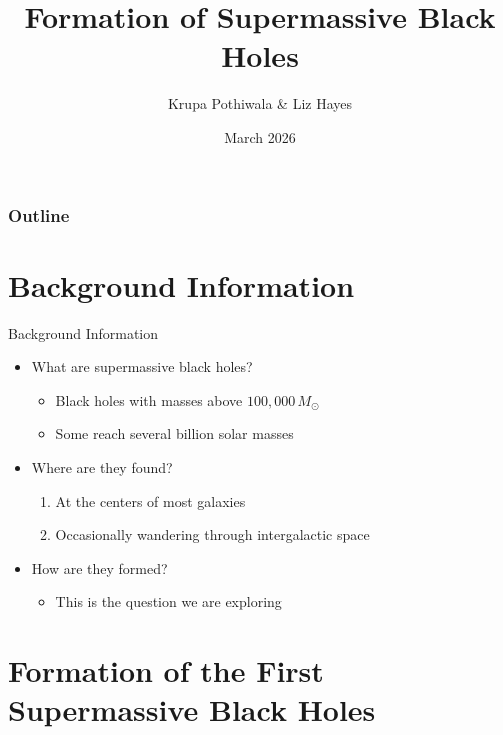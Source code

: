 \documentclass{beamer}
\title{Formation of Supermassive Black Holes}
\author{Krupa Pothiwala \& Liz Hayes}
\institute{Florida Institute of Technology}
\date{March 2026}
\begin{document}
\begin{frame}{}
\titlepage
\end{frame}

\begin{frame}
\frametitle{Outline}
\tableofcontents
\end{frame}


\section{Background Information}

\begin{frame}{Background Information}
\begin{itemize}

\item What are supermassive black holes?
\begin{itemize}
\item Black holes with masses above $100{,}000\,M_\odot$ \cite{Wikipedia2026}
\item Some reach several billion solar masses
\end{itemize}

\item Where are they found?
\begin{enumerate}
\item At the centers of most galaxies
\item Occasionally wandering through intergalactic space
\end{enumerate}

\item How are they formed?
\begin{itemize}
\item This is the question we are exploring
\end{itemize}

\end{itemize}
\end{frame}


\section{Formation of the First Supermassive Black Holes}
\end{document}
